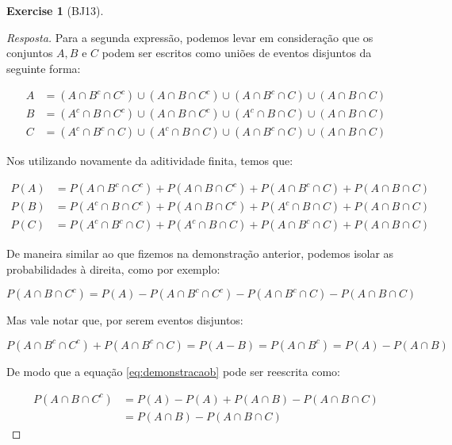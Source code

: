 \documentclass[
]{article}
\theoremstyle{definition}
\theoremstyle{definition}
\theoremstyle{definition}
\newtheorem{exercise}{Exercise}[section]
\theoremstyle{definition}
\theoremstyle{remark}
\begin{document}
\begin{exercise}[BJ13]
\begin{proof}[Resposta]
Para a segunda expressão, podemos levar em consideração que os conjuntos \(A,B \text{ e } C\) podem ser escritos como uniões de eventos disjuntos da seguinte forma:

\begin{align*}
A &= (A \cap B^{c} \cap C^{c}) \cup (A \cap B \cap C^{c}) \cup (A \cap B^{c} \cap C) \cup (A \cap B \cap C) \\
B &= (A^{c} \cap B \cap C^{c}) \cup (A \cap B \cap C^{c}) \cup (A^{c} \cap B \cap C) \cup (A \cap B \cap C) \\
C &= (A^{c} \cap B^{c} \cap C) \cup (A^{c} \cap B \cap C) \cup (A \cap B^{c} \cap C) \cup (A \cap B \cap C)
\end{align*}

Nos utilizando novamente da aditividade finita, temos que:

\begin{align*}
P(A) &= P(A \cap B^{c} \cap C^{c}) + P(A \cap B \cap C^{c}) + P(A \cap B^{c} \cap C) + P(A \cap B \cap C) \\
P(B) &= P(A^{c} \cap B \cap C^{c}) + P(A \cap B \cap C^{c}) + P(A^{c} \cap B \cap C) + P(A \cap B \cap C) \\
P(C) &= P(A^{c} \cap B^{c} \cap C) + P(A^{c} \cap B \cap C) + P(A \cap B^{c} \cap C) + P(A \cap B \cap C)
\end{align*}

De maneira similar ao que fizemos na demonstração anterior, podemos isolar as probabilidades à direita, como por exemplo:

\begin{equation}
P(A \cap B \cap C^{c}) = P(A) - P(A \cap B^{c} \cap C^{c}) - P(A \cap B^{c} \cap C) - P(A \cap B \cap C)
\label{eq:demonstracaob}
\end{equation}

Mas vale notar que, por serem eventos disjuntos:

\begin{equation*}
P(A \cap B^{c} \cap C^{c}) + P(A \cap B^{c} \cap C) = P(A - B) = P(A \cap B^{c}) = P(A) - P(A \cap B)
\end{equation*}

De modo que a equação \eqref{eq:demonstracaob} pode ser reescrita como:

\begin{align*}
P(A \cap B \cap C^{c}) &= P(A) - P(A) + P(A \cap B) - P(A \cap B \cap C) \\
&= P(A \cap B) - P(A \cap B \cap C)
\end{align*}


\end{proof}
\end{exercise}
\end{document}
